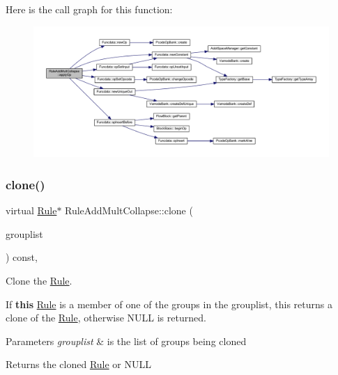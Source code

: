Here is the call graph for this function\+:
\nopagebreak
\begin{figure}[H]
\begin{center}
\leavevmode
\includegraphics[width=350pt]{class_rule_add_mult_collapse_a6f9afdaabcba06d6a739e7ff9a148fc3_cgraph}
\end{center}
\end{figure}
\mbox{\label{class_rule_add_mult_collapse_a954a3e869a8c8946773f189d02482182}} 
\subsubsection{\texorpdfstring{clone()}{clone()}}
{\footnotesize\ttfamily virtual \mbox{\hyperlink{class_rule}{Rule}}$\ast$ Rule\+Add\+Mult\+Collapse\+::clone (\begin{DoxyParamCaption}\item[{const \mbox{\hyperlink{class_action_group_list}{Action\+Group\+List}} \&}]{grouplist }\end{DoxyParamCaption}) const\hspace{0.3cm}{\ttfamily [inline]}, {\ttfamily [virtual]}}



Clone the \mbox{\hyperlink{class_rule}{Rule}}. 

If {\bfseries{this}} \mbox{\hyperlink{class_rule}{Rule}} is a member of one of the groups in the grouplist, this returns a clone of the \mbox{\hyperlink{class_rule}{Rule}}, otherwise N\+U\+LL is returned. 
\begin{DoxyParams}{Parameters}
{\em grouplist} & is the list of groups being cloned \\
\hline
\end{DoxyParams}
\begin{DoxyReturn}{Returns}
the cloned \mbox{\hyperlink{class_rule}{Rule}} or N\+U\+LL 
\end{DoxyReturn}


